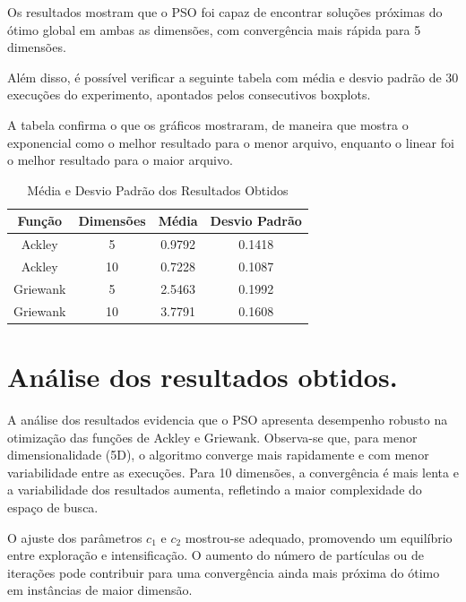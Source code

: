 \documentclass[12pt]{article}
\begin{document}
Os resultados mostram que o PSO foi capaz de encontrar soluções próximas do ótimo global em ambas as dimensões, com convergência mais rápida para 5 dimensões.


Além disso, é possível verificar a seguinte tabela com média e desvio padrão de 30 execuções do experimento, apontados pelos consecutivos boxplots.

A tabela confirma o que os gráficos mostraram, de maneira que mostra o exponencial como o melhor resultado para o menor arquivo, enquanto o linear foi o melhor resultado para o maior arquivo.

\begin{table}[H]
\centering
\caption{Média e Desvio Padrão dos Resultados Obtidos}
\begin{tabular}{|c|c|c|c|}
\hline
\textbf{Função} & \textbf{Dimensões} & \textbf{Média} & \textbf{Desvio Padrão} \\ \hline
Ackley     & 5      & 0.9792      & 0.1418 \\ \hline
Ackley     & 10     & 0.7228      & 0.1087 \\ \hline
Griewank   & 5      & 2.5463    & 0.1992 \\ \hline
Griewank   & 10     & 3.7791    & 0.1608 \\ \hline


\end{tabular}
\label{tab:resultados}
\end{table}



\section{Análise dos resultados obtidos.}
\label{sec:analise_dos_resultados_obtidos}

A análise dos resultados evidencia que o PSO apresenta desempenho robusto na otimização das funções de Ackley e Griewank. Observa-se que, para menor dimensionalidade (5D), o algoritmo converge mais rapidamente e com menor variabilidade entre as execuções. Para 10 dimensões, a convergência é mais lenta e a variabilidade dos resultados aumenta, refletindo a maior complexidade do espaço de busca.

O ajuste dos parâmetros $c_1$ e $c_2$ mostrou-se adequado, promovendo um equilíbrio entre exploração e intensificação. O aumento do número de partículas ou de iterações pode contribuir para uma convergência ainda mais próxima do ótimo em instâncias de maior dimensão.
\end{document}
